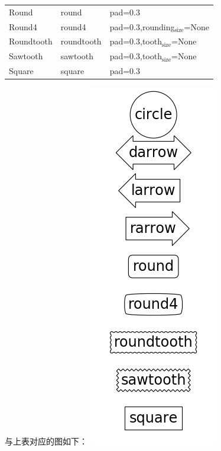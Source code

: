 \documentclass[11pt]{ctexart}
\begin{document}
\begin{enumerate}
\begin{enumerate}
\begin{center}
\begin{tabular}{lll}
Round & round & pad=0.3\\
Round4 & round4 & pad=0.3,rounding\(_{\text{size}}\)=None\\
Roundtooth & roundtooth & pad=0.3,tooth\(_{\text{size}}\)=None\\
Sawtooth & sawtooth & pad=0.3,tooth\(_{\text{size}}\)=None\\
Square & square & pad=0.3\\
\end{tabular}
\end{center}
与上表对应的图如下：
\includegraphics[width=.9\linewidth]{figs/annotation_02.png}

\end{enumerate}
\end{enumerate}
\end{document}
